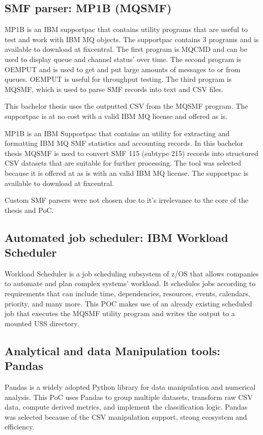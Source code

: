 \subsection{SMF parser: MP1B (MQSMF)}

MP1B is an IBM supportpac that contains utility programs that are useful to test and work with IBM MQ objects. The supportpac contains 3 programs and is available to download at fixcentral. 
The first program is MQCMD and can be used to display queue and channel status' over time. The second program is OEMPUT and is used to get and put large amounts of messages to or from queues. OEMPUT is useful for throughput testing. The third program is MQSMF, which is used to parse SMF records into text and CSV files. 

This bachelor thesis uses the outputted CSV from the MQSMF program. The supportpac is at no cost with a valid IBM MQ license and offered as is. 

MP1B is an IBM Supportpac that contains an utility for extracting and formatting IBM MQ SMF statistics and accounting records. 
In this bachelor thesis MQSMF is used to convert SMF 115 (subtype 215) records into structured CSV datasets that are suitable for further processing. 
The tool was selected because it is offered at as is with an valid IBM MQ license. The supportpac is available to download at fixcentral.

Custom SMF parsers were not chosen due to it's irrelevance to the core of the thesis and PoC.

\subsection{Automated job scheduler: IBM Workload Scheduler}
Workload Scheduler is a job scheduling subsystem of z/OS that allows companies to automate and plan complex systems' workload. It schedules jobs according to requirements that can include time, dependencies, resources, events, calendars, priority, and many more. This POC makes use of an already existing scheduled job that executes the MQSMF utility program and writes the output to a mounted USS directory. 

\subsection{Analytical and data Manipulation tools: Pandas}
Pandas is a widely adopted Python library for data manipulation and numerical 
analysis. This PoC uses Pandas to group multiple datasets, transform raw CSV data, compute derived metrics, 
and implement the classification logic. Pandas was selected because of the CSV manipulation support, strong ecosystem and efficiency. 

